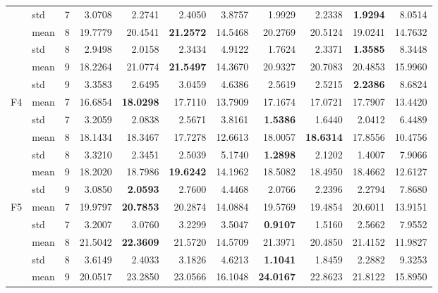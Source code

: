 \documentclass[conference]{IEEEtran}
\begin{document}
\begin{table}[]
\begin{tabular}{|c|l|l|r|r|r|r|r|r|r|r|}
 & std & 7 & 3.0708 & 2.2741 & 2.4050 & 3.8757 & 1.9929 & 2.2338 & \textbf{1.9294} & 8.0514 \\ \cline{2-11} 
 & mean & \multicolumn{1}{r|}{8} & 19.7779 & 20.4541 & \textbf{21.2572} & 14.5468 & 20.2769 & 20.5124 & 19.0241 & 14.7632 \\ \cline{2-11} 
 & std & 8 & 2.9498 & 2.0158 & 2.3434 & 4.9122 & 1.7624 & 2.3371 & \textbf{1.3585} & 8.3448 \\ \cline{2-11} 
 & mean & \multicolumn{1}{r|}{9} & 18.2264 & 21.0774 & \textbf{21.5497} & 14.3670 & 20.9327 & 20.7083 & 20.4853 & 15.9960 \\ \cline{2-11} 
 & std & 9 & 3.3583 & 2.6495 & 3.0459 & 4.6386 & 2.5619 & 2.5215 & \textbf{2.2386} & 8.6824 \\ \hline
\multirow{6}{*}{F4} & mean & \multicolumn{1}{r|}{7} & 16.6854 & \textbf{18.0298} & 17.7110 & 13.7909 & 17.1674 & 17.0721 & 17.7907 & 13.4420 \\ \cline{2-11} 
 & std & 7 & 3.2059 & 2.0838 & 2.5671 & 3.8161 & \textbf{1.5386} & 1.6440 & 2.0412 & 6.4489 \\ \cline{2-11} 
 & mean & \multicolumn{1}{r|}{8} & 18.1434 & 18.3467 & 17.7278 & 12.6613 & 18.0057 & \textbf{18.6314} & 17.8556 & 10.4756 \\ \cline{2-11} 
 & std & 8 & 3.3210 & 2.3451 & 2.5039 & 5.1740 & \textbf{1.2898} & 2.1202 & 1.4007 & 7.9066 \\ \cline{2-11} 
 & mean & \multicolumn{1}{r|}{9} & 18.2020 & 18.7986 & \textbf{19.6242} & 14.1962 & 18.5082 & 18.4950 & 18.4662 & 12.6127 \\ \cline{2-11} 
 & std & 9 & 3.0850 & \textbf{2.0593} & 2.7600 & 4.4468 & 2.0766 & 2.2396 & 2.2794 & 7.8680 \\ \hline
\multirow{6}{*}{F5} & mean & \multicolumn{1}{r|}{7} & 19.9797 & \textbf{20.7853} & 20.2874 & 14.0884 & 19.5769 & 19.4854 & 20.6011 & 13.9151 \\ \cline{2-11} 
 & std & 7 & 3.2007 & 3.0760 & 3.2299 & 3.5047 & \textbf{0.9107} & 1.5160 & 2.5662 & 7.9552 \\ \cline{2-11} 
 & mean & \multicolumn{1}{r|}{8} & 21.5042 & \textbf{22.3609} & 21.5720 & 14.5709 & 21.3971 & 20.4850 & 21.4152 & 11.9827 \\ \cline{2-11} 
 & std & 8 & 3.6149 & 2.4033 & 3.1826 & 4.6213 & \textbf{1.1041} & 1.8459 & 2.2882 & 9.3253 \\ \cline{2-11} 
 & mean & \multicolumn{1}{r|}{9} & 20.0517 & 23.2850 & 23.0566 & 16.1048 & \textbf{24.0167} & 22.8623 & 21.8122 & 15.8950 \\ \cline{2-11} 

\end{tabular}
\end{table}
\end{document}
